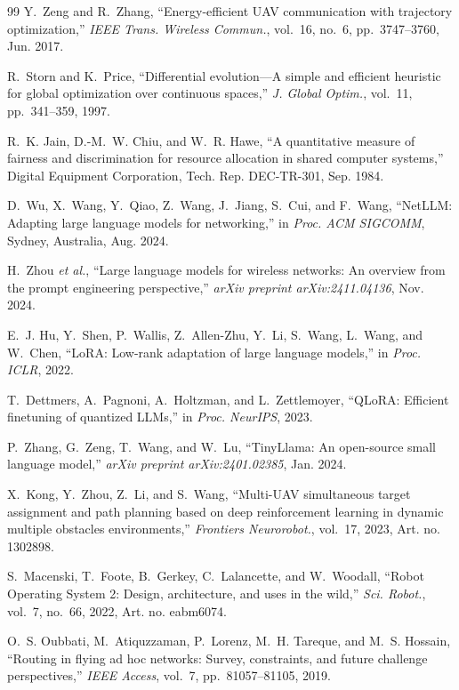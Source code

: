 \documentclass[journal]{IEEEtran}
\begin{document}
\begin{thebibliography}{99}
Y.~Zeng and R.~Zhang, ``Energy-efficient UAV communication with trajectory optimization,'' \textit{IEEE Trans. Wireless Commun.}, vol.~16, no.~6, pp.~3747--3760, Jun. 2017.

R.~Storn and K.~Price, ``Differential evolution---A simple and efficient heuristic for global optimization over continuous spaces,'' \textit{J. Global Optim.}, vol.~11, pp.~341--359, 1997.

R.~K. Jain, D.-M.~W. Chiu, and W.~R. Hawe, ``A quantitative measure of fairness and discrimination for resource allocation in shared computer systems,'' Digital Equipment Corporation, Tech. Rep. DEC-TR-301, Sep. 1984.

D.~Wu, X.~Wang, Y.~Qiao, Z.~Wang, J.~Jiang, S.~Cui, and F.~Wang, ``NetLLM: Adapting large language models for networking,'' in \textit{Proc. ACM SIGCOMM}, Sydney, Australia, Aug. 2024.

H.~Zhou \textit{et al.}, ``Large language models for wireless networks: An overview from the prompt engineering perspective,'' \textit{arXiv preprint arXiv:2411.04136}, Nov. 2024.

E.~J. Hu, Y.~Shen, P.~Wallis, Z.~Allen-Zhu, Y.~Li, S.~Wang, L.~Wang, and W.~Chen, ``LoRA: Low-rank adaptation of large language models,'' in \textit{Proc. ICLR}, 2022.

T.~Dettmers, A.~Pagnoni, A.~Holtzman, and L.~Zettlemoyer, ``QLoRA: Efficient finetuning of quantized LLMs,'' in \textit{Proc. NeurIPS}, 2023.

P.~Zhang, G.~Zeng, T.~Wang, and W.~Lu, ``TinyLlama: An open-source small language model,'' \textit{arXiv preprint arXiv:2401.02385}, Jan. 2024.

X.~Kong, Y.~Zhou, Z.~Li, and S.~Wang, ``Multi-UAV simultaneous target assignment and path planning based on deep reinforcement learning in dynamic multiple obstacles environments,'' \textit{Frontiers Neurorobot.}, vol.~17, 2023, Art. no. 1302898.

S.~Macenski, T.~Foote, B.~Gerkey, C.~Lalancette, and W.~Woodall, ``Robot Operating System 2: Design, architecture, and uses in the wild,'' \textit{Sci. Robot.}, vol.~7, no.~66, 2022, Art. no. eabm6074.

O.~S. Oubbati, M.~Atiquzzaman, P.~Lorenz, M.~H. Tareque, and M.~S. Hossain, ``Routing in flying ad hoc networks: Survey, constraints, and future challenge perspectives,'' \textit{IEEE Access}, vol.~7, pp.~81057--81105, 2019.


\end{thebibliography}
\end{document}
